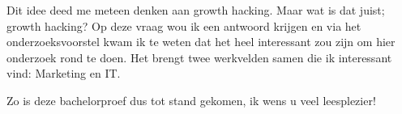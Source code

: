 Dit idee deed me meteen denken aan growth hacking. Maar wat is dat juist; growth hacking? Op deze vraag wou ik een antwoord krijgen en via het onderzoeksvoorstel kwam ik te weten dat het heel interessant zou zijn om hier onderzoek rond te doen. Het brengt twee werkvelden samen die ik interessant vind: Marketing en IT.

Zo is deze bachelorproef dus tot stand gekomen, ik wens u veel leesplezier!